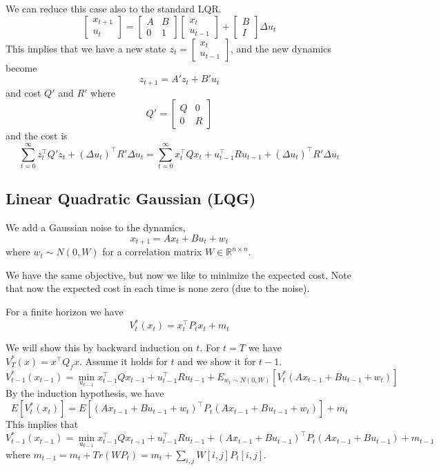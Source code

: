 We can reduce this case also to the standard LQR.
\[
\begin{bmatrix}
x_{t+1}\\
u_t
\end{bmatrix}
=\begin{bmatrix}
A&B\\
0&1
\end{bmatrix}
\begin{bmatrix}
x_{t}\\
u_{t-1}
\end{bmatrix}+
\begin{bmatrix}
B\\
I
\end{bmatrix}
\Delta u_t
\]
This implies that we have a new state $z_t=\begin{bmatrix}
x_{t}\\
u_{t-1}
\end{bmatrix}$, and the new dynamics become
\[
z_{t+1}=A'z_t+B'u_t
\]
and cost $Q'$ and $R'$ where
\[
Q'=\begin{bmatrix}Q & 0\\ 0 & R\end{bmatrix}
\]
and the cost is
\[
\sum_{t=0}^\infty z_t^\top Q'z_t+(\Delta u_t)^\top R' \Delta u_t =
\sum_{t=0}^\infty x_t^\top Qx_t+u_{t-1}^\top R u_{t-1}+(\Delta
u_t)^\top R' \Delta u_t
\]


\subsection{Linear Quadratic Gaussian (LQG)}

We add a Gaussian noise to the dynamics,
\[
x_{t+1}=A x_t + B u_t +w_t
\]
where $w_t \sim N(0,W)$ for a correlation matrix $W\in
\mathbb{R}^{n\times n }$.

We have the same objective, but now we like to minimize the expected
cost. Note that now the expected cost in each time is none zero (due
to the noise).

For a finite horizon we have
\[
V^*_t(x_t)= x_t^\top P_t x_t + m_t
\]

 We will show this by
backward induction on $t$. For $t=T$ we have $V_T^*(x)=x^\top Q_fx$.
Assume it holds for $t$ and we show it for $t-1$.
\[
V^*_{t-1}(x_{t-1})=\min_{u_{t-1}} x_{t-1}^\top Qx_{t-1}+u_{t-1}^\top
Ru_{t-1}+E_{w_t\sim N(0,W)}[V^*_t(Ax_{t-1}+Bu_{t-1}+w_t)]
\]
By the induction hypothesis, we have
\[
E[V^*_t(x_t)]=E[(Ax_{t-1}+Bu_{t-1}+w_t)^\top P_t
(Ax_{t-1}+Bu_{t-1}+w_t)]+m_t
\]
This implies that
\[
V^*_{t-1}(x_{t-1})=\min_{u_{t-1}} x_{t-1}^\top Qx_{t-1}+u_{t-1}^\top
Ru_{t-1}+(Ax_{t-1}+Bu_{t-1})^\top P_t (Ax_{t-1}+Bu_{t-1})+m_{t-1}
\]
where $m_{t-1}=m_t +Tr(WP_t)=m_t +\sum_{i,j} W[i,j]P_t[i,j]$.

